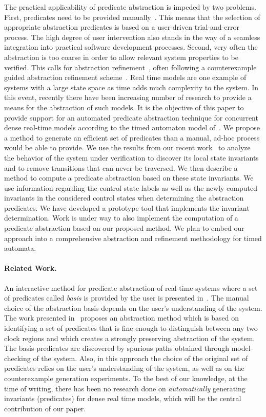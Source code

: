 \documentclass{eptcs}
\begin{document}
The practical applicability of predicate abstraction is impeded by two problems.
First, predicates need to be provided manually~\cite{Lahiri06b,Das02}. 
This means that the selection of appropriate abstraction predicates is based
on a user-driven trial-and-error process. The high degree of user intervention
also stands in the way of a seamless integration into practical software 
development processes. Second, very often the abstraction is too coarse in order
to allow relevant system properties to be verified. This calls for abstraction 
refinement~\cite{Colon98}, often following a counterexample guided abstraction refinement
scheme~\cite{clarke00guided,Ball02}.
Real time models are one example of systems with a large state space as time
adds much complexity to the system. In this event, recently there have been
increasing number of research to provide a means for the abstraction of such
models.  It is the objective of this paper to provide support for an automated
predicate abstraction technique for concurrent dense real-time models
according to the timed automaton model of~\cite{alur94}.  We propose a method
to generate an efficient set of predicates than a manual, ad-hoc process would
be able to provide.  We use the results from our recent work~\cite{BaLeSm09}
to analyze the behavior of the system under verification to discover its local
state invariants and to remove transitions that can never be traversed.
We then describe a method to compute a predicate abstraction based on these
state invariants. We use information regarding the control state labels as
well as the newly computed invariants in the considered control states when
determining the abstraction predicates.  We have developed a prototype tool
that implements the invariant determination.  Work is under way to also
implement the computation of
a predicate abstraction based on our proposed method. We plan to embed 
our approach into a comprehensive abstraction and refinement methodology
for timed automata.

\paragraph{Related Work.}
An interactive method for
predicate abstraction of real-time systems where a set of predicates called
{\em basis} is provided by the user is presented in~\cite{Colon98}. 
The manual choice of the abstraction basis depends on the user's understanding
of the system.  The work presented in~\cite{Moller02,Sorea:FTRTFT04} proposes an abstraction method
which is based on identifying a set of predicates that is fine enough to
distinguish between any two clock regions and which creates a strongly preserving
abstraction of the system. 
The basis predicates are discovered by spurious paths obtained
through model-checking of the system. Also, in this approach the choice of
the original set of predicates relies on the user's understanding of the system, 
as well as on the counterexample generation experiments.
To the best of our knowledge, at the time of writing, there
has been no research done on {\em automatically} 
generating invariants (predicates) for dense real time models,
which will be the central contribution of our paper.
\end{document}

